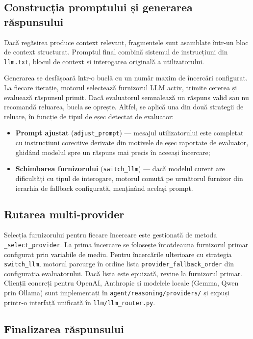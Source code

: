 \documentclass[12pt, a4paper, oneside, romanian]{teza-upb}
\begin{document}
\subsection{Construcția promptului și generarea răspunsului}

Dacă regăsirea produce context relevant, fragmentele sunt asamblate într-un bloc de context structurat. Promptul final combină sistemul de instrucțiuni din \texttt{llm.txt}, blocul de context și interogarea originală a utilizatorului.

Generarea se desfășoară într-o buclă cu un număr maxim de încercări configurat. La fiecare iterație, motorul selectează furnizorul LLM activ, trimite cererea și evaluează răspunsul primit. Dacă evaluatorul semnalează un răspuns valid sau nu recomandă reluarea, bucla se oprește. Altfel, se aplică una din două strategii de reluare, în funcție de tipul de eșec detectat de evaluator:

\begin{itemize}
    \item \textbf{Prompt ajustat} (\texttt{adjust\_prompt}) — mesajul utilizatorului este completat cu instrucțiuni corective derivate din motivele de eșec raportate de evaluator, ghidând modelul spre un răspuns mai precis în aceeași încercare;
    \item \textbf{Schimbarea furnizorului} (\texttt{switch\_llm}) — dacă modelul curent are dificultăți cu tipul de interogare, motorul comută pe următorul furnizor din ierarhia de fallback configurată, menținând același prompt.
\end{itemize}

\subsection{Rutarea multi-provider}

Selecția furnizorului pentru fiecare încercare este gestionată de metoda \texttt{\_select\_provider}. La prima încercare se folosește întotdeauna furnizorul primar configurat prin variabile de mediu. Pentru încercările ulterioare cu strategia \texttt{switch\_llm}, motorul parcurge în ordine lista \texttt{provider\_fallback\_order} din configurația evaluatorului. Dacă lista este epuizată, revine la furnizorul primar. Clienții concreți pentru OpenAI, Anthropic și modelele locale (Gemma, Qwen prin Ollama) sunt implementați în \texttt{agent/reasoning/providers/} și expuși printr-o interfață unificată în \texttt{llm/llm\_router.py}.

\subsection{Finalizarea răspunsului}
\end{document}
